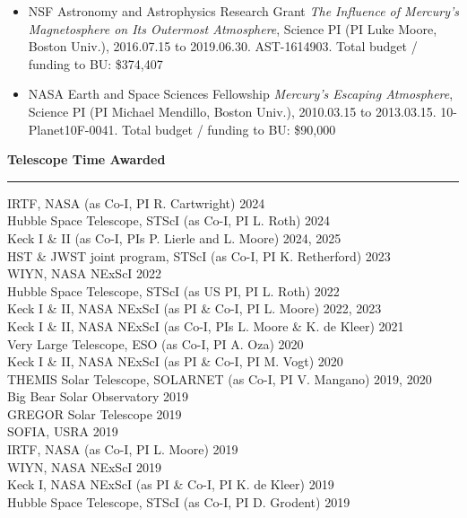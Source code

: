 \documentclass[12pt]{report}
\begin{document}
\begin{itemize}
 \item NSF Astronomy and Astrophysics Research Grant {\it The Influence of Mercury's Magnetosphere on Its Outermost Atmosphere}, Science PI (PI Luke Moore, Boston Univ.), 2016.07.15 to 2019.06.30. AST-1614903. Total budget / funding to BU: \$374,407
 \item NASA Earth and Space Sciences Fellowship {\it Mercury's Escaping Atmosphere}, Science PI (PI Michael Mendillo, Boston Univ.), 2010.03.15 to 2013.03.15. 10-Planet10F-0041. Total budget / funding to BU: \$90,000
 \end{itemize}
\vspace{2 mm}

\noindent\bf{Telescope Time Awarded}\rm \hspace*{\fill} \\
\rule{\textwidth}{1pt}
IRTF, NASA (as Co-I, PI R. Cartwright) \hfill 2024\\
Hubble Space Telescope, STScI (as Co-I, PI L. Roth) \hfill 2024\\
Keck I \& II (as Co-I, PIs P. Lierle and L. Moore) \hfill 2024, 2025\\
HST \& JWST joint program, STScI (as Co-I, PI K. Retherford) \hfill 2023\\
WIYN, NASA NExScI \hfill 2022\\
Hubble Space Telescope, STScI (as US PI, PI L. Roth) \hfill 2022\\
Keck I \& II, NASA NExScI (as PI \& Co-I, PI L. Moore) \hfill 2022, 2023\\
Keck I \& II, NASA NExScI (as Co-I, PIs L. Moore \& K. de Kleer) \hfill 2021\\
Very Large Telescope, ESO (as Co-I, PI A. Oza) \hfill 2020\\
Keck I \& II, NASA NExScI  (as PI \& Co-I, PI M. Vogt) \hfill 2020\\
THEMIS Solar Telescope, SOLARNET (as Co-I, PI V. Mangano) \hfill 2019, 2020\\
Big Bear Solar Observatory \hfill 2019\\
GREGOR Solar Telescope \hfill 2019\\
SOFIA, USRA \hfill 2019\\
IRTF, NASA (as Co-I, PI L. Moore) \hfill 2019\\
WIYN, NASA NExScI \hfill 2019\\
Keck I, NASA NExScI (as PI \& Co-I, PI K. de Kleer) \hfill 2019\\
Hubble Space Telescope, STScI (as Co-I, PI D. Grodent) \hfill 2019\\
\end{document}
